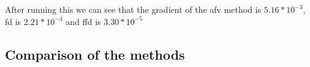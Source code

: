 \documentclass[aps,twocolumn,pre,nofootinbib,10pt]{revtex4-1}
\begin{document}
After running this we can see that the gradient of the afv method is $5.16*10^{-3}$, fd is $2.21*10^{-4}$ and ffd is $3.30*10^{-5}$

\subsection{Comparison of the methods}
\end{document}
